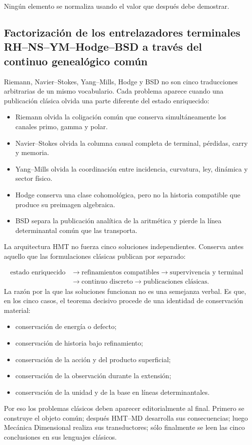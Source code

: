 Ningún elemento se normaliza usando el valor que después debe demostrar.\par
{}
\subsection{Factorización de los entrelazadores terminales RH–NS–YM–Hodge–BSD a través del continuo genealógico común}
Riemann, Navier–Stokes, Yang–Mills, Hodge y BSD no son cinco traducciones arbitrarias de un mismo vocabulario. Cada problema aparece cuando una publicación clásica olvida una parte diferente del estado enriquecido:\par
\begin{itemize}
\item Riemann olvida la coligación común que conserva simultáneamente los canales primo, gamma y polar.
\item Navier–Stokes olvida la columna causal completa de terminal, pérdidas, carry y memoria.
\item Yang–Mills olvida la coordinación entre incidencia, curvatura, ley, dinámica y sector físico.
\item Hodge conserva una clase cohomológica, pero no la historia compatible que produce su preimagen algebraica.
\item BSD separa la publicación analítica de la aritmética y pierde la línea determinantal común que las transporta.
\end{itemize}
La arquitectura HMT no fuerza cinco soluciones independientes. Conserva antes aquello que las formulaciones clásicas publican por separado:\par
\[
\begin{aligned}
\text{estado enriquecido}
&\longrightarrow \text{refinamientos compatibles}
\longrightarrow \text{supervivencia y terminal}\\
&\longrightarrow \text{continuo discreto}
\longrightarrow \text{publicaciones clásicas}.
\end{aligned}
\]
La razón por la que las soluciones funcionan no es una semejanza verbal. Es que, en los cinco casos, el teorema decisivo procede de una identidad de conservación material:\par
\begin{itemize}
\item conservación de energía o defecto;
\item conservación de historia bajo refinamiento;
\item conservación de la acción y del producto superficial;
\item conservación de la observación durante la extensión;
\item conservación de la unidad y de la base en líneas determinantales.
\end{itemize}
Por eso los problemas clásicos deben aparecer editorialmente al final. Primero se construye el objeto común; después HMT–MD desarrolla sus consecuencias; luego Mecánica Dimensional realiza sus transductores; sólo finalmente se leen las cinco conclusiones en sus lenguajes clásicos.\par
{}
